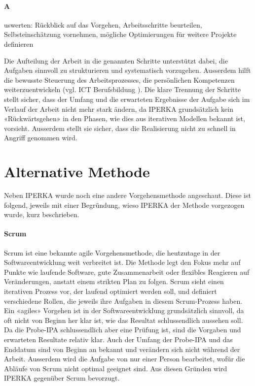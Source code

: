 \paragraph{A} uswerten: Rückblick auf das Vorgehen, Arbeitsschritte beurteilen, Selbsteinschätzung vornehmen, mögliche Optimierungen für weitere Projekte definieren

\newpage
Die Aufteilung der Arbeit in die genannten Schritte unterstützt dabei, die Aufgaben sinnvoll zu strukturieren und systematisch vorzugehen. Ausserdem hilft die bewusste Steuerung des Arbeitsprozesses, die persönlichen Kompetenzen weiterzuentwickeln (vgl. ICT Berufsbildung \parencite{ict}). Die klare Trennung der Schritte stellt sicher, dass der Umfang und die erwarteten Ergebnisse der Aufgabe sich im Verlauf der Arbeit nicht mehr stark ändern, da IPERKA grundsätzlich kein «Rückwärtsgehen» in den Phasen, wie dies aus iterativen Modellen bekannt ist, vorsieht. Ausserdem stellt sie sicher, dass die Realisierung nicht zu schnell in Angriff genommen wird.

\section{Alternative Methode}\label{sec:alternative-methode}
Neben IPERKA wurde noch eine andere Vorgehensmethode angeschaut. Diese ist folgend, jeweils mit einer Begründung, wieso IPERKA der Methode vorgezogen wurde, kurz beschrieben.

\paragraph{Scrum} Scrum ist eine bekannte agile Vorgehensmethode, die heutzutage in der Softwareentwicklung weit verbreitet ist. Die Methode legt den Fokus mehr auf Punkte wie laufende Software, gute Zusammenarbeit oder flexibles Reagieren auf Veränderungen, anstatt einem strikten Plan zu folgen. Scrum sieht einen iterativen Prozess vor, der laufend optimiert werden soll, und definiert verschiedene Rollen, die jeweils ihre Aufgaben in diesem Scrum-Prozess haben. Ein «agiles» Vorgehen ist in der Softwareentwicklung grundsätzlich sinnvoll, da oft nicht von Beginn her klar ist, wie das Resultat schlussendlich aussehen soll. Da die Probe-IPA schlussendlich aber eine Prüfung ist, sind die Vorgaben und erwarteten Resultate relativ klar. Auch der Umfang der Probe-IPA und das Enddatum sind von Beginn an bekannt und verändern sich nicht während der Arbeit. Ausserdem wird die Aufgabe von nur einer Person bearbeitet, wofür die Abläufe von Scrum nicht optimal geeignet sind. Aus diesen Gründen wird IPERKA gegenüber Scrum bevorzugt.
